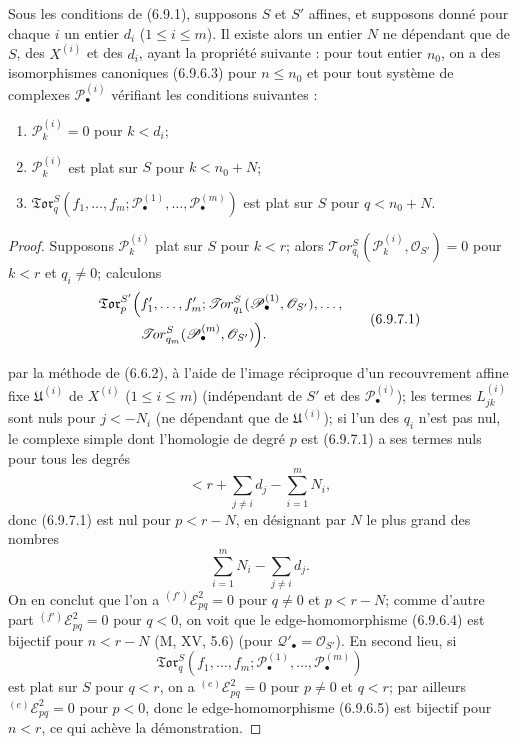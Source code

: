 \begin{corollary}[6.9.7]
Sous les conditions de (6.9.1), supposons $S$ et $S'$ affines, et supposons
donné pour chaque $i$ un entier $d_i$ ($1\leq i\leq m$). Il existe alors un
entier $N$ ne dépendant que de $S$, des $X^{(i)}$ et des $d_i$, ayant la
propriété suivante : pour tout entier $n_0$, on a des isomorphismes canoniques
(6.9.6.3) pour $n\leq n_0$ et pour tout système de complexes
$\mathscr P_\bullet^{(i)}$ vérifiant les conditions suivantes :
\begin{enumerate}
  \item[$1^\circ$] $\mathscr P_k^{(i)}=0$ pour $k<d_i$;
  \item[$2^\circ$] $\mathscr P_k^{(i)}$ est plat sur $S$ pour $k<n_0+N$;
  \item[$3^\circ$]
  $\mathfrak{Tor}_q^S(f_1,\ldots,f_m;
  \mathscr P_\bullet^{(1)},\ldots,\mathscr P_\bullet^{(m)})$ est plat sur
  $S$ pour $q<n_0+N$.
\end{enumerate}
\end{corollary}

\begin{proof}
Supposons $\mathscr P_k^{(i)}$ plat sur $S$ pour $k<r$; alors
$\mathscr{T}\!or_{q_i}^S(\mathscr P_k^{(i)},\mathscr O_{S'})=0$ pour $k<r$
et $q_i\ne0$; calculons
\[
\begin{split}
  \mathfrak{Tor}_p^{S'}\Bigl(
  &f'_1,\ldots,f'_m;
  \mathscr{T}\!or_{q_1}^S(\mathscr P_\bullet^{(1)},\mathscr O_{S'}),
  \ldots,\\
  &\mathscr{T}\!or_{q_m}^S(\mathscr P_\bullet^{(m)},\mathscr O_{S'})
  \Bigr).
\end{split}
\tag{6.9.7.1}\label{III.6.9.7.1.fr}
\]

par la méthode de (6.6.2), à l'aide de l'image réciproque d'un recouvrement
affine fixe $\mathfrak U^{(i)}$ de $X^{(i)}$ ($1\leq i\leq m$)
(indépendant de $S'$ et des $\mathscr P_\bullet^{(i)}$); les termes
$L_{jk}^{(i)}$ sont nuls pour $j<-N_i$ (ne dépendant que de
$\mathfrak U^{(i)}$); si l'un des $q_i$ n'est pas nul, le complexe simple dont
l'homologie de degré $p$ est (6.9.7.1) a ses termes nuls pour tous les degrés
\[
  <r+\sum_{j\ne i}d_j-\sum_{i=1}^m N_i,
\]
donc (6.9.7.1) est nul pour $p<r-N$, en désignant par $N$ le plus grand des
nombres
\[
  \sum_{i=1}^m N_i-\sum_{j\ne i}d_j.
\]
On en conclut que l'on a ${}^{(f')}\mathscr E_{pq}^2=0$ pour $q\ne0$ et
$p<r-N$; comme d'autre part ${}^{(f')}\mathscr E_{pq}^2=0$ pour $q<0$, on
voit que le edge-homomorphisme (6.9.6.4) est bijectif pour $n<r-N$
(M, XV, 5.6) (pour $\mathscr Q'_\bullet=\mathscr O_{S'}$). En second lieu, si
\[
  \mathfrak{Tor}_q^S
  (f_1,\ldots,f_m;
   \mathscr P_\bullet^{(1)},\ldots,\mathscr P_\bullet^{(m)})
\]
est plat sur $S$ pour $q<r$, on a ${}^{(e)}\mathscr E_{pq}^2=0$ pour $p\ne0$
et $q<r$; par ailleurs ${}^{(e)}\mathscr E_{pq}^2=0$ pour $p<0$, donc le
edge-homomorphisme (6.9.6.5) est bijectif pour $n<r$, ce qui achève la
démonstration.
\end{proof}

